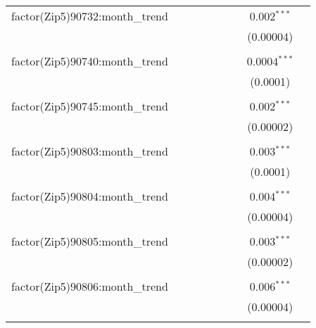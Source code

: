 \begin{table}[H]
{\begin{tabular}{@{\extracolsep{5pt}}lcccccccc}
  factor(Zip5)90732:month\_trend &  &  &  &  &  &  & 0.002$^{***}$ &  \\  

   &  &  &  &  &  &  & (0.00004) &  \\  

   & & & & & & & & \\  

  factor(Zip5)90740:month\_trend &  &  &  &  &  &  & 0.0004$^{***}$ &  \\  

   &  &  &  &  &  &  & (0.0001) &  \\  

   & & & & & & & & \\  

  factor(Zip5)90745:month\_trend &  &  &  &  &  &  & 0.002$^{***}$ &  \\  

   &  &  &  &  &  &  & (0.00002) &  \\  

   & & & & & & & & \\  

  factor(Zip5)90803:month\_trend &  &  &  &  &  &  & 0.003$^{***}$ &  \\  

   &  &  &  &  &  &  & (0.0001) &  \\  

   & & & & & & & & \\  

  factor(Zip5)90804:month\_trend &  &  &  &  &  &  & 0.004$^{***}$ &  \\  

   &  &  &  &  &  &  & (0.00004) &  \\  

   & & & & & & & & \\  

  factor(Zip5)90805:month\_trend &  &  &  &  &  &  & 0.003$^{***}$ &  \\  

   &  &  &  &  &  &  & (0.00002) &  \\  

   & & & & & & & & \\  

  factor(Zip5)90806:month\_trend &  &  &  &  &  &  & 0.006$^{***}$ &  \\  

   &  &  &  &  &  &  & (0.00004) &  \\  

   & & & & & & & & \\  


\end{tabular}}
\end{table}
